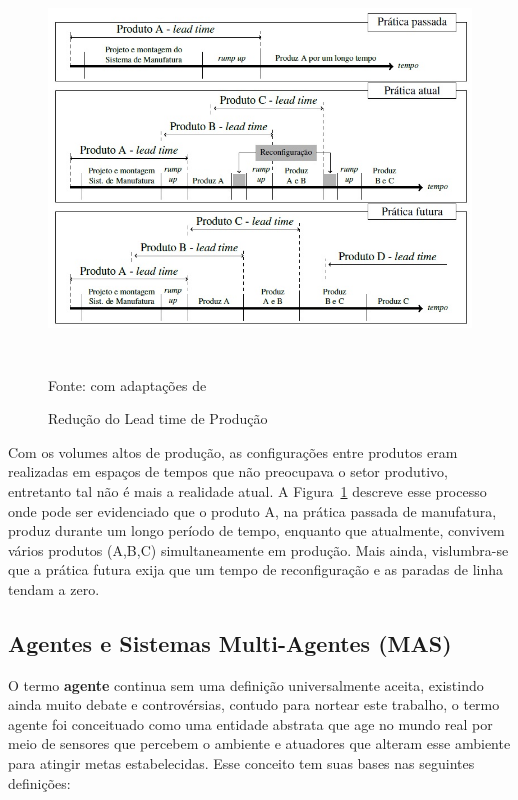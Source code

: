	
\begin{figure}[h!]
	\centering
	\includegraphics[width=\textwidth, height=10cm]{img/F8_SIAPE_Lead_Time_EPS.jpg} 
	\caption{Redução do Lead time de Produção}
	{\footnotesize{Fonte: \cite{KOREN1999} com adaptações de \cite{CAVALCANTE2012a}}}
	\label{F8}
\end{figure}
	

Com os volumes altos de produção, as configurações entre produtos eram realizadas em espaços de tempos que não preocupava o setor produtivo, entretanto tal não é mais a realidade atual. A Figura~\ref{F8} descreve esse processo onde pode ser evidenciado que o produto A, na prática passada de manufatura, produz durante um longo período de tempo, enquanto que atualmente, convivem vários produtos (A,B,C) simultaneamente em produção. Mais ainda, vislumbra-se que a prática futura exija que um tempo de reconfiguração e as paradas de linha tendam a zero.




\subsection{Agentes e Sistemas Multi-Agentes (MAS)}	

O termo \textbf{agente} continua sem uma definição universalmente aceita, existindo  ainda muito debate e controvérsias, contudo para nortear este trabalho, o termo agente foi conceituado como uma entidade abstrata que age no mundo real por meio de sensores que percebem o ambiente e atuadores que alteram esse ambiente para atingir metas estabelecidas. Esse conceito tem suas bases nas seguintes definições:\par 

